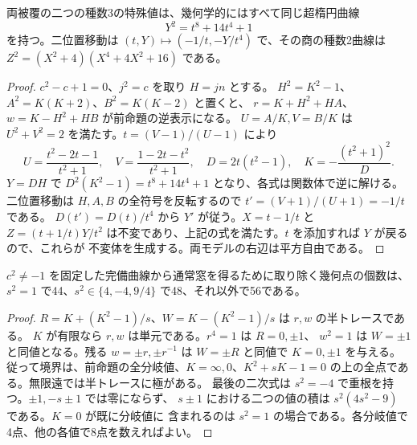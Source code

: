 \begin{corollary}\label{cor:rank-fifteen-octic}
両被覆の二つの種数3の特殊値は、幾何学的にはすべて同じ超楕円曲線
\[
 Y^2=t^8+14t^4+1
\]
を持つ。二位置移動は $(t,Y)\mapsto(-1/t,-Y/t^4)$ で、その商の種数2曲線は
$Z^2=(X^2+4)(X^4+4X^2+16)$ である。
\end{corollary}
\begin{proof}
$c^2-c+1=0$、$j^2=c$ を取り $H=jn$ とする。
$H^2=K^2-1$、$A^2=K(K+2)$、$B^2=K(K-2)$ と置くと、
$r=K+H^2+HA$、$w=K-H^2+HB$ が前命題の逆表示になる。
$U=A/K,V=B/K$ は $U^2+V^2=2$ を満たす。$t=(V-1)/(U-1)$ により
\[
 U=\frac{t^2-2t-1}{t^2+1},\quad V=\frac{1-2t-t^2}{t^2+1},\quad
 D=2t(t^2-1),\quad K=-\frac{(t^2+1)^2}{D}.
\]
$Y=DH$ で $D^2(K^2-1)=t^8+14t^4+1$ となり、各式は関数体で逆に解ける。
二位置移動は $H,A,B$ の全符号を反転するので $t'=(V+1)/(U+1)=-1/t$ である。
$D(t')=D(t)/t^4$ から $Y'$ が従う。$X=t-1/t$ と $Z=(t+1/t)Y/t^2$
は不変であり、上記の式を満たす。$t$ を添加すれば $Y$ が戻るので、これらが
不変体を生成する。両モデルの右辺は平方自由である。
\end{proof}

\begin{corollary}\label{cor:rank-fifteen-pencil-boundary}
$c^2\ne-1$ を固定した完備曲線から通常窓を得るために取り除く幾何点の個数は、
$s^2=1$ で44、$s^2\in\{4,-4,9/4\}$ で48、それ以外で56である。
\end{corollary}
\begin{proof}
$R=K+(K^2-1)/s$、$W=K-(K^2-1)/s$ は $r,w$ の半トレースである。
$K$ が有限なら $r,w$ は単元である。$r^4=1$ は $R=0,\pm1$、
$w^2=1$ は $W=\pm1$ と同値となる。残る $w=\pm r,\pm r^{-1}$ は
$W=\pm R$ と同値で $K=0,\pm1$ を与える。
従って境界は、前命題の全分岐値、$K=\infty,0$、$K^2+sK-1=0$
の上の全点である。無限遠では半トレースに極がある。
最後の二次式は $s^2=-4$ で重根を持つ。$\pm1,-s\pm1$ では零にならず、
$s\pm1$ における二つの値の積は $s^2(4s^2-9)$ である。$K=0$ が既に分岐値に
含まれるのは $s^2=1$ の場合である。各分岐値で4点、他の各値で8点を数えればよい。
\end{proof}
